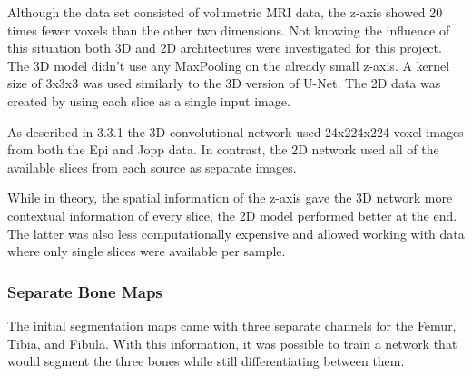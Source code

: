 Although the data set consisted of volumetric MRI data, the z-axis showed 20 times fewer voxels than the other two dimensions. Not knowing the influence of this situation both 3D and 2D architectures were investigated for this project. The 3D model didn't use any MaxPooling on the already small z-axis. A kernel size of 3x3x3 was used similarly to the 3D version of U-Net. The 2D data was created by using each slice as a single input image.

As described in 3.3.1 the 3D convolutional network used 24x224x224 voxel images from both the Epi and Jopp data. In contrast, the 2D network used all of the available slices from each source as separate images.

While in theory, the spatial information of the z-axis gave the 3D network more contextual information of every slice, the 2D model performed better at the end. The latter was also less computationally expensive and allowed working with data where only single slices were available per sample.

\subsubsection{Separate Bone Maps}

The initial segmentation maps came with three separate channels for the Femur, Tibia, and Fibula. With this information, it was possible to train a network that would segment the three bones while still differentiating between them.

